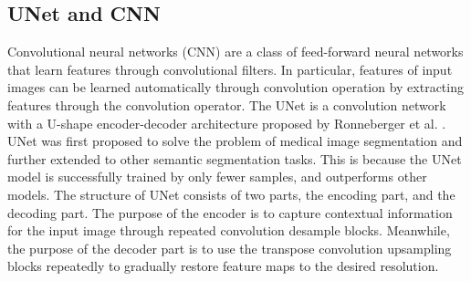 \documentclass{article}
\begin{document}
\subsection{UNet and CNN}
Convolutional neural networks (CNN) are a class of feed-forward neural networks that learn features through convolutional filters. In particular, features of input images can be learned automatically through convolution operation by extracting features through the convolution operator. The UNet is a convolution network with a U-shape encoder-decoder architecture proposed by Ronneberger et al. \cite{3-2-Unet-ronneberger2015u}. UNet was first proposed to solve the problem of medical image segmentation and further extended to other semantic segmentation tasks. This is because the UNet model is successfully trained by only fewer samples, and outperforms other models. The structure of UNet consists of two parts, the encoding part, and the decoding part. The purpose of the encoder is to capture contextual information for the input image through repeated convolution desample blocks. Meanwhile, the purpose of the decoder part is to use the transpose convolution upsampling blocks repeatedly to gradually restore feature maps to the desired resolution.
\end{document}
